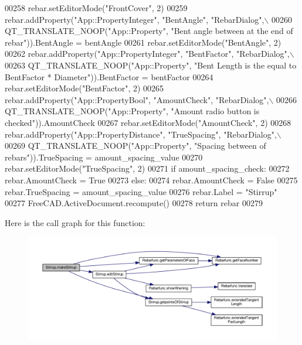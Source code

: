 \begin{DoxyCode}
00258     rebar.setEditorMode(\textcolor{stringliteral}{"FrontCover"}, 2)
00259     rebar.addProperty(\textcolor{stringliteral}{"App::PropertyInteger"}, \textcolor{stringliteral}{"BentAngle"}, \textcolor{stringliteral}{"RebarDialog"},\(\backslash\)
00260         QT\_TRANSLATE\_NOOP(\textcolor{stringliteral}{"App::Property"}, \textcolor{stringliteral}{"Bent angle between at the end of rebar"})).BentAngle = bentAngle
00261     rebar.setEditorMode(\textcolor{stringliteral}{"BentAngle"}, 2)
00262     rebar.addProperty(\textcolor{stringliteral}{"App::PropertyInteger"}, \textcolor{stringliteral}{"BentFactor"}, \textcolor{stringliteral}{"RebarDialog"},\(\backslash\)
00263         QT\_TRANSLATE\_NOOP(\textcolor{stringliteral}{"App::Property"}, \textcolor{stringliteral}{"Bent Length is the equal to BentFactor * Diameter"})).BentFactor
       = bentFactor
00264     rebar.setEditorMode(\textcolor{stringliteral}{"BentFactor"}, 2)
00265     rebar.addProperty(\textcolor{stringliteral}{"App::PropertyBool"}, \textcolor{stringliteral}{"AmountCheck"}, \textcolor{stringliteral}{"RebarDialog"},\(\backslash\)
00266         QT\_TRANSLATE\_NOOP(\textcolor{stringliteral}{"App::Property"}, \textcolor{stringliteral}{"Amount radio button is checked"})).AmountCheck
00267     rebar.setEditorMode(\textcolor{stringliteral}{"AmountCheck"}, 2)
00268     rebar.addProperty(\textcolor{stringliteral}{"App::PropertyDistance"}, \textcolor{stringliteral}{"TrueSpacing"}, \textcolor{stringliteral}{"RebarDialog"},\(\backslash\)
00269         QT\_TRANSLATE\_NOOP(\textcolor{stringliteral}{"App::Property"}, \textcolor{stringliteral}{"Spacing between of rebars"})).TrueSpacing = amount\_spacing\_value
00270     rebar.setEditorMode(\textcolor{stringliteral}{"TrueSpacing"}, 2)
00271     \textcolor{keywordflow}{if} amount\_spacing\_check:
00272         rebar.AmountCheck = \textcolor{keyword}{True}
00273     \textcolor{keywordflow}{else}:
00274         rebar.AmountCheck = \textcolor{keyword}{False}
00275         rebar.TrueSpacing = amount\_spacing\_value
00276     rebar.Label = \textcolor{stringliteral}{"Stirrup"}
00277     FreeCAD.ActiveDocument.recompute()
00278     \textcolor{keywordflow}{return} rebar
00279 
\end{DoxyCode}


Here is the call graph for this function\+:\nopagebreak
\begin{figure}[H]
\begin{center}
\leavevmode
\includegraphics[width=350pt]{namespaceStirrup_a705fc121e2af9c8ac05eb299f4fb9f2f_cgraph}
\end{center}
\end{figure}




